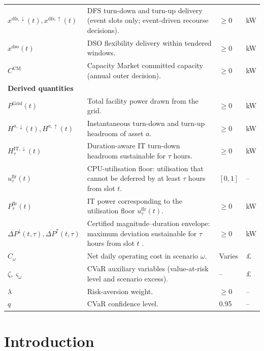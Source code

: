 \documentclass[lettersize,journal]{IEEEtran}
\begin{document}
{{\begin{longtable}{p{} p{} p{} p{}}
$x^{\mathrm{dfs},\downarrow}(t), x^{\mathrm{dfs},\uparrow}(t)$ & DFS turn-down and turn-up delivery (event slots only; event-driven recourse decisions). & $\geq 0$ & kW \\
$x^{\mathrm{dso}}(t)$ & DSO flexibility delivery within tendered windows. & $\geq 0$ & kW \\
$C^{\mathrm{CM}}$ & Capacity Market committed capacity (annual outer decision). & $\geq 0$ & kW \\
\midrule
\multicolumn{4}{l}{\textbf{Derived quantities}} \\
\midrule
$P^{\mathrm{Grid}}(t)$ & Total facility power drawn from the grid. & $\geq 0$ & kW \\
$H^{a,\downarrow}(t), H^{a,\uparrow}(t)$ & Instantaneous turn-down and turn-up headroom of asset $a$. & $\geq 0$ & kW \\
$H^{\mathrm{IT},\downarrow}_{\tau}(t)$ & Duration-aware IT turn-down headroom sustainable for $\tau$ hours. & $\geq 0$ & kW \\
$u^{\mathrm{flr}}_{\tau}(t)$ & CPU-utilisation floor: utilisation that cannot be deferred by at least $\tau$ hours from slot $t$. & $[0,1]$ & -- \\
$P^{\mathrm{flr}}_{\tau}(t)$ & IT power corresponding to the utilisation floor $u^{\mathrm{flr}}_{\tau}(t)$. & $\geq 0$ & kW \\
$\overline{\Delta P}^{\downarrow}(t,\tau), \overline{\Delta P}^{\uparrow}(t,\tau)$ & Certified magnitude--duration envelope: maximum deviation sustainable for $\tau$ hours from slot $t$ \cite{takci2026characterisation}. & $\geq 0$ & kW \\
$C_\omega$ & Net daily operating cost in scenario $\omega$. & Varies & \pounds \\
$\zeta, \varsigma_\omega$ & CVaR auxiliary variables (value-at-risk level and scenario excess). & -- & \pounds \\
$\lambda$ & Risk-aversion weight. & $\geq 0$ & -- \\
$q$ & CVaR confidence level. & 0.95 & -- \\
\end{longtable}
\twocolumn
}
}

\section{Introduction}
\end{document}
